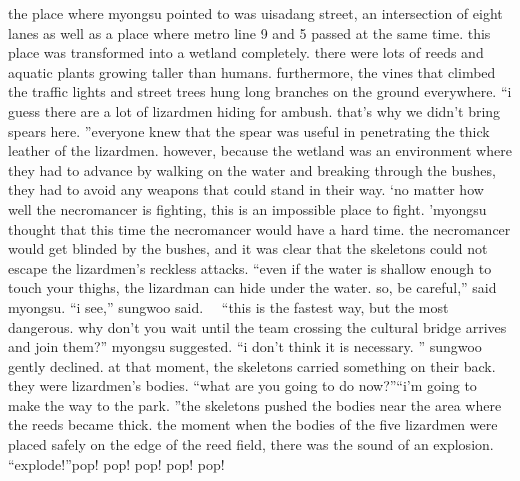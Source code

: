 the place where myongsu pointed to was uisadang street, an intersection of eight lanes as well as a place where metro line 9 and 5 passed at the same time.
 this place was transformed into a wetland completely.
there were lots of reeds and aquatic plants growing taller than humans.
 furthermore, the vines that climbed the traffic lights and street trees hung long branches on the ground everywhere.
“i guess there are a lot of lizardmen hiding for ambush.
 that’s why we didn’t bring spears here.
”everyone knew that the spear was useful in penetrating the thick leather of the lizardmen.
however, because the wetland was an environment where they had to advance by walking on the water and breaking through the bushes, they had to avoid any weapons that could stand in their way.
‘no matter how well the necromancer is fighting, this is an impossible place to fight.
’myongsu thought that this time the necromancer would have a hard time.
 the necromancer would get blinded by the bushes, and it was clear that the skeletons could not escape the lizardmen’s reckless attacks.
“even if the water is shallow enough to touch your thighs, the lizardman can hide under the water.
 so, be careful,” said myongsu.
“i see,” sungwoo said.
  “this is the fastest way, but the most dangerous.
 why don’t you wait until the team crossing the cultural bridge arrives and join them?” myongsu suggested.
“i don’t think it is necessary.
” sungwoo gently declined.
at that moment, the skeletons carried something on their back.
they were lizardmen’s bodies.
“what are you going to do now?”“i’m going to make the way to the park.
”the skeletons pushed the bodies near the area where the reeds became thick.
 the moment when the bodies of the five lizardmen were placed safely on the edge of the reed field, there was the sound of an explosion.
“explode!”pop! pop! pop! pop! pop! 

 